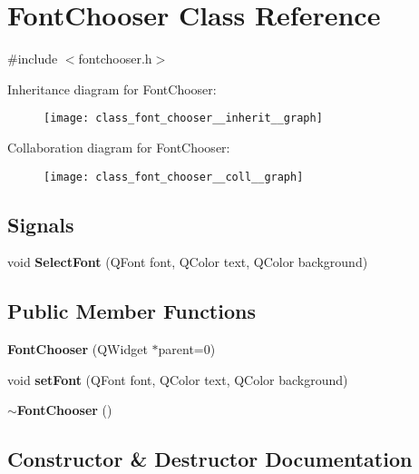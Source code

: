 \section{Font\+Chooser Class Reference}
\label{class_font_chooser}


{\ttfamily \#include $<$fontchooser.\+h$>$}



Inheritance diagram for Font\+Chooser\+:\nopagebreak
\begin{figure}[H]
\begin{center}
\leavevmode
\texttt{[image: class\_font\_chooser\_\_inherit\_\_graph]}
\end{center}
\end{figure}


Collaboration diagram for Font\+Chooser\+:\nopagebreak
\begin{figure}[H]
\begin{center}
\leavevmode
\texttt{[image: class\_font\_chooser\_\_coll\_\_graph]}
\end{center}
\end{figure}
\subsection*{Signals}
\begin{DoxyCompactItemize}
\item 
void \textbf{ Select\+Font} (Q\+Font font, Q\+Color text, Q\+Color background)
\end{DoxyCompactItemize}
\subsection*{Public Member Functions}
\begin{DoxyCompactItemize}
\item 
\textbf{ Font\+Chooser} (Q\+Widget $\ast$parent=0)
\item 
void \textbf{ set\+Font} (Q\+Font font, Q\+Color text, Q\+Color background)
\item 
\textbf{ $\sim$\+Font\+Chooser} ()
\end{DoxyCompactItemize}


\subsection{Constructor \& Destructor Documentation}
\mbox{\label{class_font_chooser_aff09499cda1a5d8b7ab90b4d4fc0291b}} 
